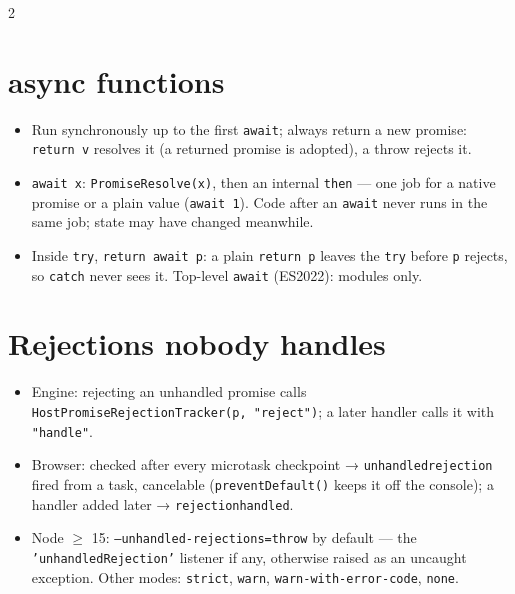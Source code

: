 \documentclass[8pt]{extarticle}
\newcommand\ct[1]{\texttt{#1}}
\begin{document}
\begin{multicols}{2}
\section{async functions}
\begin{itemize}
  \item Run synchronously up to the first \ct{await}; always return a new promise:
        \ct{return v} resolves it (a returned promise is adopted), a throw rejects it.
  \item \ct{await x}: \ct{PromiseResolve(x)}, then an internal \ct{then} — one job for a native
        promise or a plain value (\ct{await 1}). Code after an \ct{await} never runs in the
        same job; state may have changed meanwhile.
  \item Inside \ct{try}, \ct{return await p}: a plain \ct{return p} leaves the \ct{try} before
        \ct{p} rejects, so \ct{catch} never sees it. Top-level \ct{await} (ES2022): modules only.
\end{itemize}

\section{Rejections nobody handles}
\begin{itemize}
  \item Engine: rejecting an unhandled promise calls \ct{HostPromiseRejectionTracker(p,
        "reject")}; a later handler calls it with \ct{"handle"}.
  \item Browser: checked after every microtask checkpoint → \ct{unhandledrejection} fired from
        a task, cancelable (\ct{preventDefault()} keeps it off the console); a handler added
        later → \ct{rejectionhandled}.
  \item Node $\geq$ 15: \ct{--unhandled-rejections=throw} by default — the
        \ct{'unhandledRejection'} listener if any, otherwise raised as an uncaught exception.
        Other modes: \ct{strict}, \ct{warn}, \ct{warn-with-error-code}, \ct{none}.
\end{itemize}


\end{multicols}
\end{document}
